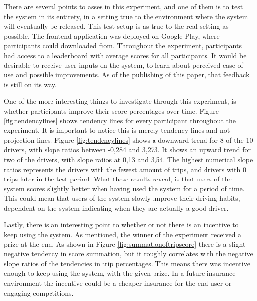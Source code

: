 There are several points to asses in this experiment, and one of them is to test the system in its entirety, in a setting true to the environment where the system will eventually be released. This test setup is as true to the real setting as possible. The frontend application was deployed on Google Play, where participants could downloaded from. Throughout the experiment, participants had access to a leaderboard with average scores for all participants. 
It would be desirable to receive user inputs on the system, to learn about perceived ease of use and possible improvements. As of the publishing of this paper, that feedback is still on its way.

One of the more interesting things to investigate through this experiment, is whether participants improve their score percentages over time. Figure \ref{fig:tendencylines} shows tendency lines for every participant throughout the experiment. It is important to notice this is merely tendency lines and not projection lines. Figure \ref{fig:tendencylines} shows a downward trend for 8 of the 10 drivers, with slope ratios between -0,284 and 3,273. It shows an upward trend for two of the drivers, with slope ratios at 0,13 and 3,54. The highest numerical slope ratios represents the drivers with the fewest amount of trips, and drivers with 0 trips later in the test period. What these results reveal, is that users of the system scores slightly better when having used the system for a period of time. This could mean that users of the system slowly improve their driving habits, dependent on the system indicating when they are actually a good driver.

Lastly, there is an interesting point to whether or not there is an incentive to keep using the system. As mentioned, the winner of the experiment received a prize at the end. As shown in Figure \ref{fig:summationoftripscore} there is a slight negative tendency in score summation, but it roughly correlates with the negative slope ratios of the tendencies in trip percentages. This means there was incentive enough to keep using the system, with the given prize. In a future insurance environment the incentive could be a cheaper insurance for the end user or engaging competitions.
 